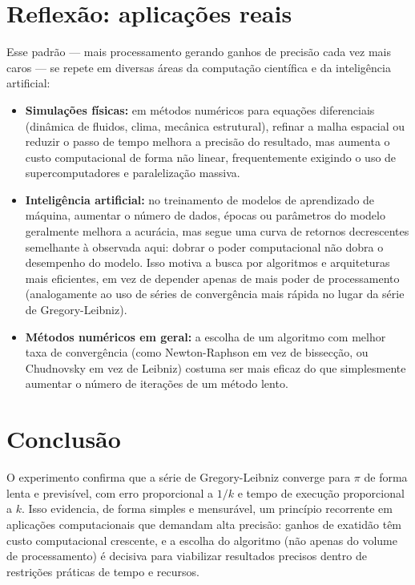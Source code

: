 \documentclass[a4paper,12pt]{article}
\begin{document}
\section{Reflexão: aplicações reais}

Esse padrão --- mais processamento gerando ganhos de precisão cada vez mais
caros --- se repete em diversas áreas da computação científica e da
inteligência artificial:

\begin{itemize}
    \item \textbf{Simulações físicas:} em métodos numéricos para equações
    diferenciais (dinâmica de fluidos, clima, mecânica estrutural), refinar a
    malha espacial ou reduzir o passo de tempo melhora a precisão do resultado,
    mas aumenta o custo computacional de forma não linear, frequentemente
    exigindo o uso de supercomputadores e paralelização massiva.

    \item \textbf{Inteligência artificial:} no treinamento de modelos de
    aprendizado de máquina, aumentar o número de dados, épocas ou parâmetros do
    modelo geralmente melhora a acurácia, mas segue uma curva de retornos
    decrescentes semelhante à observada aqui: dobrar o poder computacional não
    dobra o desempenho do modelo. Isso motiva a busca por algoritmos e
    arquiteturas mais eficientes, em vez de depender apenas de mais poder de
    processamento (analogamente ao uso de séries de convergência mais rápida no
    lugar da série de Gregory-Leibniz).

    \item \textbf{Métodos numéricos em geral:} a escolha de um algoritmo com
    melhor taxa de convergência (como Newton-Raphson em vez de bissecção, ou
    Chudnovsky em vez de Leibniz) costuma ser mais eficaz do que simplesmente
    aumentar o número de iterações de um método lento.
\end{itemize}

\section{Conclusão}

O experimento confirma que a série de Gregory-Leibniz converge para $\pi$ de
forma lenta e previsível, com erro proporcional a $1/k$ e tempo de execução
proporcional a $k$. Isso evidencia, de forma simples e mensurável, um princípio
recorrente em aplicações computacionais que demandam alta precisão: ganhos de
exatidão têm custo computacional crescente, e a escolha do algoritmo (não
apenas do volume de processamento) é decisiva para viabilizar resultados
precisos dentro de restrições práticas de tempo e recursos.
\end{document}
